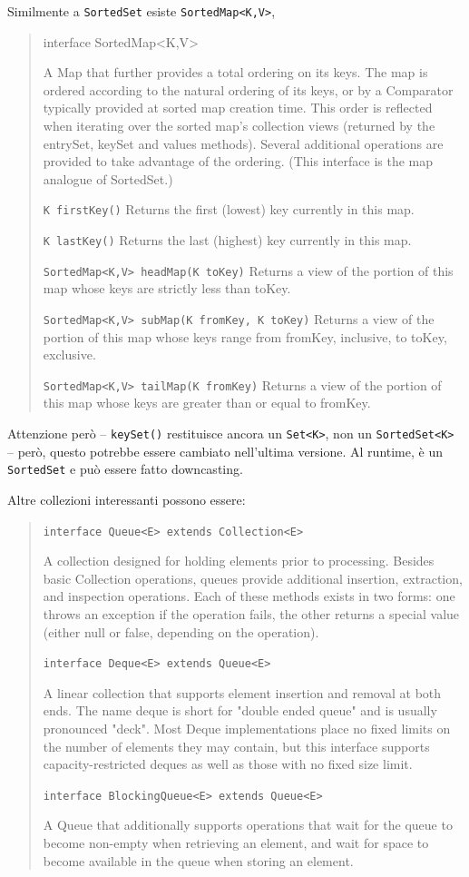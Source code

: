 \documentclass[\fontsizeclass,twocolumn]{\classname}
\theoremstyle{definition}
\theoremstyle{definition}
\begin{document}
Similmente a \texttt{SortedSet} esiste \texttt{SortedMap<K,V>},
\begin{quote}
    \footnotesize{interface SortedMap<K,V>

A Map that further provides a total ordering on its keys. The map is ordered according to the natural ordering of its keys, or by a Comparator typically provided at sorted map creation time. This order is reflected when iterating over the sorted map's collection views (returned by the entrySet, keySet and values methods). Several additional operations are provided to take advantage of the ordering. (This interface is the map analogue of SortedSet.)

\texttt{K 	firstKey()} 	Returns the first (lowest) key currently in this map.

\texttt{K 	lastKey()} 	Returns the last (highest) key currently in this map.

\texttt{SortedMap<K,V> 	headMap(K toKey)} 	Returns a view of the portion of this map whose keys are strictly less than toKey.

\texttt{SortedMap<K,V> 	subMap(K fromKey, K toKey)} 	Returns a view of the portion of this map whose keys range from fromKey, inclusive, to toKey, exclusive.

\texttt{SortedMap<K,V> 	tailMap(K fromKey)} 	Returns a view of the portion of this map whose keys are greater than or equal to fromKey.
}
\end{quote}

Attenzione però -- \texttt{keySet()} restituisce ancora un \texttt{Set<K>}, non
un \texttt{SortedSet<K>} -- però, questo potrebbe essere cambiato nell'ultima
versione. Al runtime, è un \texttt{SortedSet} e può essere fatto downcasting.

Altre collezioni interessanti possono essere:
\begin{quote}
    \footnotesize{\texttt{interface Queue<E> extends Collection<E>}

A collection designed for holding elements prior to processing. Besides basic Collection operations, queues provide additional insertion, extraction, and inspection operations. Each of these methods exists in two forms: one throws an exception if the operation fails, the other returns a special value (either null or false, depending on the operation).

\texttt{interface Deque<E> extends Queue<E>}

A linear collection that supports element insertion and removal at both ends. The name deque is short for "double ended queue" and is usually pronounced "deck". Most Deque implementations place no fixed limits on the number of elements they may contain, but this interface supports capacity-restricted deques as well as those with no fixed size limit.

\texttt{interface BlockingQueue<E> extends Queue<E>}

A Queue that additionally supports operations that wait for the queue to become non-empty when retrieving an element, and wait for space to become available in the queue when storing an element.
}
\end{quote}
\end{document}
